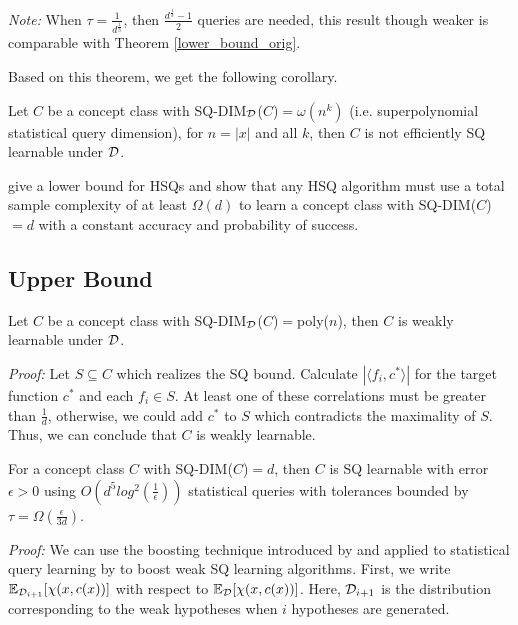 \textit{Note: }When $\tau=\frac{1}{d^{\frac{1}{3}}}$, then $\frac{d^{\frac{1}{3}}-1}{2}$ queries are needed, this result though weaker is comparable with Theorem \ref{lower_bound_orig}.

Based on this theorem, we get the following corollary.

\begin{corollary}
\label{not_learnable}
Let $C$ be a concept class with SQ-DIM$_{\mathcal{D}}$($C$)$ = \omega(n^k)$ (i.e. superpolynomial statistical query dimension), for $n=|x|$ and all $k$, then $C$ is not efficiently SQ learnable under $\mathcal{D}$.
\end{corollary}

\cite{yang_new_2005} give a lower bound for HSQs and show that any HSQ algorithm must use a total sample complexity of at least $\Omega(d)$ to learn a concept class with SQ-DIM($C$)$ = d$ with a constant accuracy and probability of success.

\subsection{Upper Bound}
\begin{proposition}
Let $C$ be a concept class with SQ-DIM$_{\mathcal{D}}$($C$)$ = $poly($n$), then $C$ is weakly learnable under $\mathcal{D}$.
\end{proposition}

\textit{Proof:} Let $S \subseteq C$ which realizes the SQ bound. Calculate $|\langle f_i, c^* \rangle|$ for the target function $c^*$  and each $f_i \in S$. At least one of these correlations must be greater than $\frac{1}{d}$, otherwise, we could add $c^*$ to $S$ which contradicts the maximality of $S$. Thus, we can conclude that $C$ is weakly learnable.

\begin{theorem}
For a concept class $C$ with SQ-DIM($C$)$ = d$, then $C$ is SQ learnable with error $\epsilon > 0$ using $O\left(d^5log^2\left(\frac{1}{\epsilon}\right)\right)$ statistical queries with tolerances bounded by $\tau = \Omega\left(\frac{\epsilon}{3d}\right)$.
\end{theorem}

\textit{Proof:} We can use the boosting technique introduced by \cite{freund_improved_1992} and applied to statistical query learning by \cite{aslam_general_1998} to boost weak SQ learning algorithms. First, we write $\mathbb{E}_{\mathcal{D}_{i+1}}[\chi(x, c(x))]$ with respect to $\mathbb{E}_{\mathcal{D}}[\chi(x, c(x))]$. Here, $\mathcal{D}_{i+1}$ is the distribution corresponding to the weak hypotheses when $i$ hypotheses are generated.

